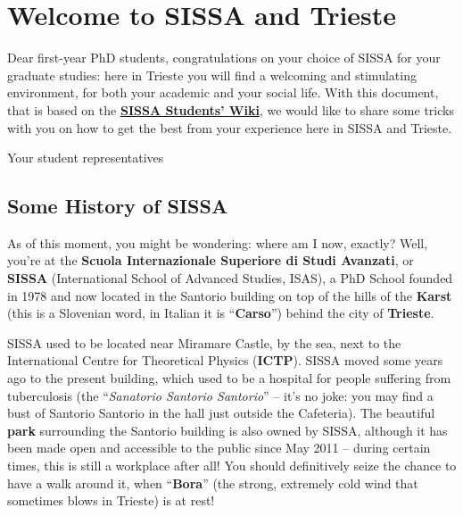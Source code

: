 \documentclass{sissavademecum}
\begin{document}
\maketitle
\tableofcontents
\newpage

\setlength{\parskip}{1em}


\chapter{Welcome to SISSA and Trieste}

Dear first-year PhD students, congratulations on your choice of SISSA for your graduate studies: here in Trieste you will find a welcoming and stimulating environment, for both your academic and your social life. With this document, that is based on the \href{https://wiki.sissa.it/students/index.php/Main_Page}{\textbf{SISSA Students' Wiki}}, we would like to share some tricks with you on how to get the best from your experience here in SISSA and Trieste. 

\begin{flushright}	
	Your student representatives
\end{flushright}


\section{Some History of SISSA}

As of this moment, you might be wondering: where am I now, exactly? Well, you're at the \textbf{Scuola Internazionale Superiore di Studi Avanzati}, or \textbf{SISSA} (International School of Advanced Studies, ISAS), a PhD School founded in 1978 and now located in the Santorio building on top of the hills of the \textbf{Karst} (this is a Slovenian word, in Italian it is ``\textbf{Carso}'') behind the city of \textbf{Trieste}.

SISSA used to be located near Miramare Castle, by the sea, next to the International Centre for Theoretical Physics (\textbf{ICTP}). SISSA moved some years ago to the present building, which used to be a hospital for people suffering from tuberculosis (the ``\textit{Sanatorio Santorio Santorio}'' -- it's no joke: you may find a bust of Santorio Santorio in the hall just outside the Cafeteria). The beautiful \textbf{park }surrounding the Santorio building is also owned by SISSA, although it has been made open and accessible to the public since May 2011 -- during certain times, this is still a workplace after all! You should definitively seize the chance to have a walk around it, when ``\textbf{Bora}'' (the strong, extremely cold wind that sometimes blows in Trieste) is at rest!
\end{document}
